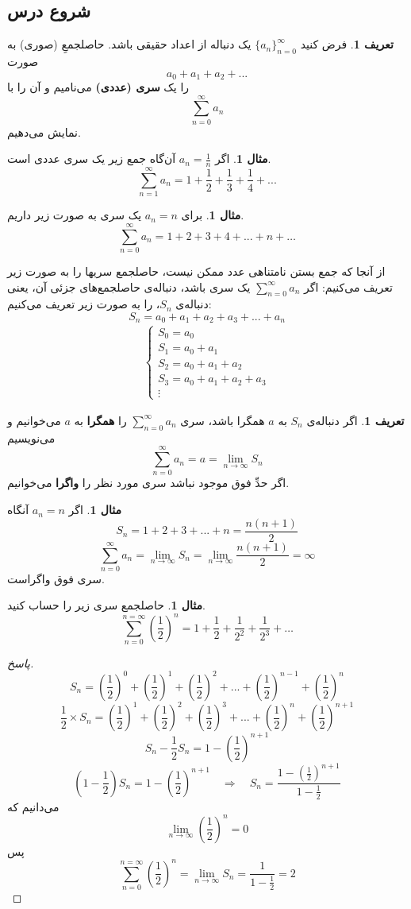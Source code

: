 \documentclass[12pt,a4paper]{article}
\theoremstyle{definition}
\newtheorem{mesal}[thm]{مثال}
\newtheorem{defn}[thm]{تعریف}
\begin{document}
\subsection*{شروع درس}
\begin{defn}
فرض کنید
$\{a_n\}_{n=0}^{\infty}$
یک دنباله از اعداد حقیقی باشد.  حاصلجمعِ  (صوری) به صورت 
\[
a_0+a_1+a_2+...
\]
را یک
\textbf{ سری (عددی) }
می‌نامیم و آن را با 
\[
\sum_{n=0}^{\infty} a_n
\]
نمایش می‌دهیم.
\end{defn}
\begin{mesal}
اگر
$a_n=\frac{1}{n}$
آن‌گاه جمع زیر یک سری عددی است. 
\[
\sum_{n=1}^{\infty}a_n=1+\frac{1}{2}+\frac{1}{3}+\frac{1}{4}+...
\]
\end{mesal}
\begin{mesal}
برای
$a_n=n$
یک سری به صورت زیر داریم.
\[
\sum_{n=0}^{\infty} a_n=1+2+3+4+...+n+\ldots
\]
\end{mesal}
از آنجا که جمع بستن نامتناهی عدد ممکن نیست، حاصلجمع سریها را به صورت زیر تعریف می‌کنیم:
اگر 
$\sum_{n=0}^{\infty}a_n$
یک سری باشد، 
دنباله‌ی
حاصلجمع‌های جزئی آن، یعنی دنباله‌ی
$S_n$،
 را به صورت زیر تعریف می‌کنیم:
\[
S_n=a_0+a_1+a_2+a_3+...+a_n
\]
\begin{align*}
\begin{cases}
S_0=a_0
\\
S_1=a_0+a_1
\\
S_2=a_0+a_1+a_2
\\
S_3=a_0+a_1+a_2+a_3
\\
\vdots 
\end{cases}
\end{align*}
\begin{defn}
اگر دنباله‌ی 
$S_n$
به
$a$
همگرا باشد، سری 
$\sum_{n=0}^{\infty}a_n$
را\textbf{ همگرا} به 
$a$
می‌خوانیم و می‌نویسیم
\[
\sum_{n=0}^{\infty}a_n=a=\lim_{n \to \infty}S_n
\]
اگر حدِّ فوق موجود نباشد سری مورد نظر را 
\textbf{واگرا}
می‌خوانیم.
\end{defn}
\begin{mesal}
اگر 
$a_n=n$
آنگاه
\[
S_n=1+2+3+...+n=\frac{n(n+1)}{2}
\]
\[
\sum_{n=0}^{\infty}a_n=
\lim_{n\to \infty}S_n=
\lim_{n \to \infty}\frac{n(n+1)}{2}=\infty
\]
سری فوق واگراست. 
\end{mesal}
\begin{mesal}
حاصلجمع سری زیر را حساب کنید.
\[
\sum_{n=0}^{n=\infty}(\frac{1}{2})^n=1+\frac{1}{2}+\frac{1}{2^2}+\frac{1}{2^3}+\ldots
\]
\end{mesal}
\begin{proof}[پاسخ]
\[
S_n=(\frac{1}{2})^0+(\frac{1}{2})^1+(\frac{1}{2})^2+...+(\frac{1}{2})^{n-1}+(\frac{1}{2})^{n}
\]
\[
\frac{1}{2} \times S_n=(\frac{1}{2})^1+(\frac{1}{2})^2+(\frac{1}{2})^3+...+(\frac{1}{2})^{n}+(\frac{1}{2})^{n+1}
\]
\[
S_n-\frac{1}{2} S_n=1-(\frac{1}{2})^{n+1}
\]
\[
(1-\frac{1}{2})S_n=1-(\frac{1}{2})^{n+1} \quad \Rightarrow \quad S_n=\frac{1-(\frac{1}{2})^{n+1}}{1-\frac{1}{2}}
\]
می‌دانیم که
\[
\lim_{n \to \infty}(\frac{1}{2})^n=0
\]
پس
\[
\sum_{n=0}^{n=\infty}(\frac{1}{2})^n=
\lim_{n \to \infty}S_n=\frac{1}{1-\frac{1}{2}}=2
\]
\end{proof}
\end{document}
